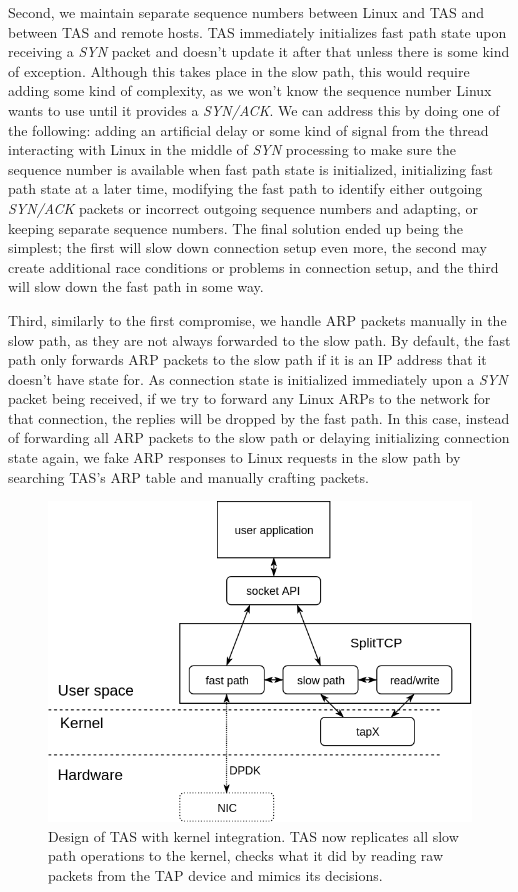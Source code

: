 Second, we maintain separate sequence numbers between Linux and TAS and 
between TAS and remote hosts. TAS immediately initializes fast path 
state upon receiving a \textit{SYN} packet and doesn't update it after that unless 
there is some kind of exception. Although this takes place in the slow path,
this would require adding some kind of complexity, as we won't know the sequence
number Linux wants to use until it provides a \textit{SYN/ACK}. We can address this by 
doing one of the following: adding an artificial delay or some kind of signal 
from the thread interacting with Linux in the middle of \textit{SYN} processing to make 
sure the sequence number is available when fast path state is initialized, 
initializing fast path state at a later time, modifying the fast path to 
identify either outgoing \textit{SYN/ACK} packets or incorrect outgoing sequence numbers
and adapting, or keeping separate sequence numbers. The final solution ended up 
being the simplest; the first will slow down connection setup even more, the 
second may create additional race conditions or problems in connection setup, 
and the third will slow down the fast path in some way.

Third, similarly to the first compromise, we handle ARP packets manually in 
the slow path, as they are not always forwarded to the slow path. By default,
the fast path only forwards ARP packets to the slow path if it is an IP address
that it doesn't have state for. As connection state is initialized immediately 
upon a \textit{SYN} packet being received, if we try to forward any Linux ARPs to the 
network for that connection, the replies will be dropped by the fast path. In
this case, instead of forwarding all ARP packets to the slow path or delaying
initializing connection state again, we fake ARP responses to Linux requests 
in the slow path by searching TAS's ARP table and manually crafting 
packets. 

\begin{figure}
\centering
\includegraphics[width=0.7\columnwidth]{figures/splittcp.png}
\caption{Design of TAS with kernel integration. TAS now replicates all slow path operations to the kernel, checks what
it did by reading raw packets from the TAP device and mimics its decisions.}
\label{fig:splittcp_tap}
\end{figure}

